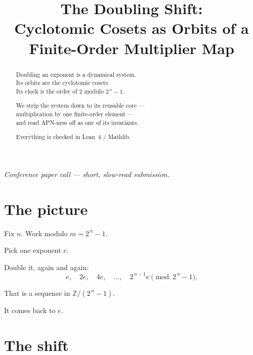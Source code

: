 \documentclass[11pt]{article}
\title{\textbf{The Doubling Shift:\\[2pt]
Cyclotomic Cosets as Orbits of a Finite-Order Multiplier Map}}
\author{}
\date{}
\begin{document}
\maketitle

\thispagestyle{empty}

\begin{abstract}
\noindent
Doubling an exponent is a dynamical system.\\
Its orbits are the cyclotomic cosets.\\
Its clock is the order of $2$ modulo $2^{\,n}-1$.

\medskip
\noindent
We strip the system down to its reusable core ---\\
multiplication by one finite-order element ---\\
and read APN-ness off as one of its invariants.

\medskip
\noindent
Everything is checked in Lean~4 / Mathlib.
\end{abstract}

\vfill

\noindent\textit{Conference paper call --- short, slow-read submission.}

\newpage


\section{The picture}

\bigskip

Fix $n$. Work modulo $m = 2^{\,n}-1$.

\bigskip

Pick one exponent $e$.

\bigskip

Double it, again and again:
\[
  e,\quad 2e,\quad 4e,\quad \dots,\quad 2^{\,n-1}e
  \pmod{2^{\,n}-1}.
\]

\bigskip

That is a sequence in $\mathbb{Z}/(2^{\,n}-1)$.

\bigskip

It comes back to $e$.

\bigskip


\newpage


\section{The shift}

\bigskip
\end{document}
